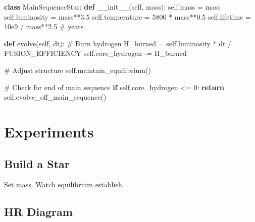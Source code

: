 \documentclass[
  11pt,
  letterpaper,
  twoside,
  openright]{book}
\newenvironment{Shaded}{\begin{snugshade}}{\end{snugshade}}
\newcommand{\CommentTok}[1]{\textcolor[rgb]{0.37,0.37,0.37}{#1}}
\newcommand{\ControlFlowTok}[1]{\textcolor[rgb]{0.00,0.23,0.31}{\textbf{#1}}}
\newcommand{\DecValTok}[1]{\textcolor[rgb]{0.68,0.00,0.00}{#1}}
\newcommand{\FloatTok}[1]{\textcolor[rgb]{0.68,0.00,0.00}{#1}}
\newcommand{\FunctionTok}[1]{\textcolor[rgb]{0.28,0.35,0.67}{#1}}
\newcommand{\KeywordTok}[1]{\textcolor[rgb]{0.00,0.23,0.31}{\textbf{#1}}}
\newcommand{\NormalTok}[1]{\textcolor[rgb]{0.00,0.23,0.31}{#1}}
\newcommand{\OperatorTok}[1]{\textcolor[rgb]{0.37,0.37,0.37}{#1}}
\newcommand{\VariableTok}[1]{\textcolor[rgb]{0.07,0.07,0.07}{#1}}
\begin{document}
\begin{Shaded}
\begin{Highlighting}[]
\KeywordTok{class}\NormalTok{ MainSequenceStar:}
    \KeywordTok{def} \FunctionTok{\_\_init\_\_}\NormalTok{(}\VariableTok{self}\NormalTok{, mass):}
        \VariableTok{self}\NormalTok{.mass }\OperatorTok{=}\NormalTok{ mass}
        \VariableTok{self}\NormalTok{.luminosity }\OperatorTok{=}\NormalTok{ mass}\OperatorTok{**}\FloatTok{3.5}
        \VariableTok{self}\NormalTok{.temperature }\OperatorTok{=} \DecValTok{5800} \OperatorTok{*}\NormalTok{ mass}\OperatorTok{**}\FloatTok{0.5}
        \VariableTok{self}\NormalTok{.lifetime }\OperatorTok{=} \FloatTok{10e9} \OperatorTok{/}\NormalTok{ mass}\OperatorTok{**}\FloatTok{2.5}  \CommentTok{\# years}

    \KeywordTok{def}\NormalTok{ evolve(}\VariableTok{self}\NormalTok{, dt):}
        \CommentTok{\# Burn hydrogen}
\NormalTok{        H\_burned }\OperatorTok{=} \VariableTok{self}\NormalTok{.luminosity }\OperatorTok{*}\NormalTok{ dt }\OperatorTok{/}\NormalTok{ FUSION\_EFFICIENCY}
        \VariableTok{self}\NormalTok{.core\_hydrogen }\OperatorTok{{-}=}\NormalTok{ H\_burned}

        \CommentTok{\# Adjust structure}
        \VariableTok{self}\NormalTok{.maintain\_equilibrium()}

        \CommentTok{\# Check for end of main sequence}
        \ControlFlowTok{if} \VariableTok{self}\NormalTok{.core\_hydrogen }\OperatorTok{\textless{}=} \DecValTok{0}\NormalTok{:}
            \ControlFlowTok{return} \VariableTok{self}\NormalTok{.evolve\_off\_main\_sequence()}
\end{Highlighting}
\end{Shaded}

\section{Experiments}\label{experiments-20}

\subsection{Build a Star}\label{build-a-star}

Set mass. Watch equilibrium establish.

\subsection{HR Diagram}\label{hr-diagram}
\end{document}
